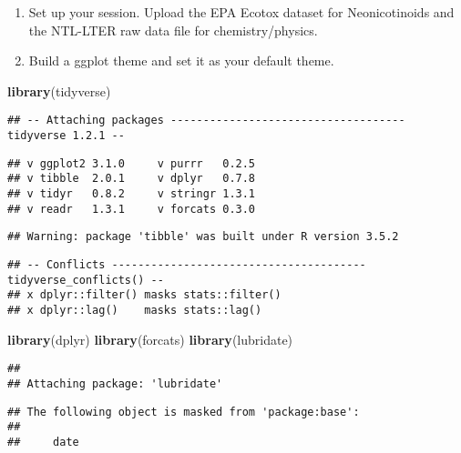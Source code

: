 \documentclass[]{article}
\newenvironment{Shaded}{\begin{snugshade}}{\end{snugshade}}
\newcommand{\KeywordTok}[1]{\textcolor[rgb]{0.13,0.29,0.53}{\textbf{#1}}}
\newcommand{\NormalTok}[1]{#1}
\begin{document}
\begin{enumerate}
\def\labelenumi{\arabic{enumi}.}
\item
  Set up your session. Upload the EPA Ecotox dataset for Neonicotinoids
  and the NTL-LTER raw data file for chemistry/physics.
\item
  Build a ggplot theme and set it as your default theme.
\end{enumerate}

\begin{Shaded}
\begin{Highlighting}[]
\KeywordTok{library}\NormalTok{(tidyverse)}
\end{Highlighting}
\end{Shaded}

\begin{verbatim}
## -- Attaching packages ------------------------------------ tidyverse 1.2.1 --
\end{verbatim}

\begin{verbatim}
## v ggplot2 3.1.0     v purrr   0.2.5
## v tibble  2.0.1     v dplyr   0.7.8
## v tidyr   0.8.2     v stringr 1.3.1
## v readr   1.3.1     v forcats 0.3.0
\end{verbatim}

\begin{verbatim}
## Warning: package 'tibble' was built under R version 3.5.2
\end{verbatim}

\begin{verbatim}
## -- Conflicts --------------------------------------- tidyverse_conflicts() --
## x dplyr::filter() masks stats::filter()
## x dplyr::lag()    masks stats::lag()
\end{verbatim}

\begin{Shaded}
\begin{Highlighting}[]
\KeywordTok{library}\NormalTok{(dplyr)}
\KeywordTok{library}\NormalTok{(forcats)}
\KeywordTok{library}\NormalTok{(lubridate)}
\end{Highlighting}
\end{Shaded}

\begin{verbatim}
## 
## Attaching package: 'lubridate'
\end{verbatim}

\begin{verbatim}
## The following object is masked from 'package:base':
## 
##     date
\end{verbatim}
\end{document}
